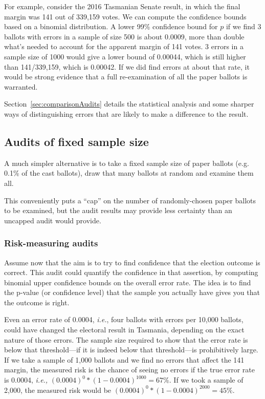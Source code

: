 \documentclass[10pt,a4paper]{article}
\newcommand{\VTNote}[1]{}
\newcommand{\longVersion}[1]{#1}
\newcommand{\longVersion}[1]{}
\begin{document}
For example, consider the 2016 Tasmanian Senate result, in which the final margin was 141 out of 339,159 votes.  We can compute the confidence bounds based on a binomial distribution.  A lower 99\% confidence bound for $p$ if we find 3 ballots with errors in a sample of size 500 is about 0.0009, more than double
what's needed to account for the apparent margin of 141 votes. 3 errors in a sample size of 1000 would give a lower bound of 0.00044, which is still higher than
141/339,159, which is 0.00042.  If we did find errors at about that rate, it would be strong evidence that a full re-examination of all the paper ballots is warranted.


\longVersion{Section~\ref{sec:comparisonAudits} details the statistical analysis and some sharper ways of distinguishing errors that are likely to make a difference to the result.  \VTNote{Actually I'm not sure it does.  Not sure there are any useful sharper distinctions.  Are the stats just binomial bounds again?}}

\subsection{Audits of fixed sample size} \label{subsec:fixedSize}
A much simpler alternative is to
take a fixed sample size of paper ballots (e.g. 0.1\% of the cast ballots), draw that
many ballots at random and examine them all.

This conveniently puts a ``cap'' on the number of randomly-chosen 
paper ballots to be examined, but 
the audit results may provide less certainty than an uncapped
audit would provide.

\subsubsection{Risk-measuring audits}

Assume now that the aim is to try to find confidence that the election outcome is correct.  This audit could quantify the confidence in that assertion, by computing binomial upper confidence bounds on the overall error rate.    The idea is to find the p-value (or confidence level) that the sample you actually have gives you that the outcome is right.


Even an error rate of 0.0004, {\it i.e.}, four ballots with errors per 10,000 ballots, could have changed the electoral result in Tasmania, depending on the exact nature of those errors. The sample size required to show that the error rate is below that threshold---if it is indeed below that threshold---is prohibitively large. 
If we take a sample of 1,000 ballots and we find no errors that affect the 141 margin, the measured risk is the chance of seeing no errors if the true error rate is 0.0004, {\it i.e.,} $(0.0004)^0 * (1-0.0004)^{1000} = 67\%.$
If we took a sample of 2,000, the measured risk would be $(0.0004)^0 * (1-0.0004)^{2000} = 45\%.$
\end{document}
